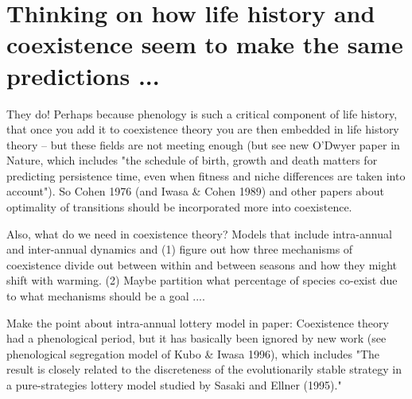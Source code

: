 \documentclass[11pt]{article}
\begin{document}
\section{Thinking on how life history and coexistence seem to make the same predictions ...}
They do! Perhaps because phenology is such a critical component of life history, that once you add it to coexistence theory you are then embedded in life history theory -- but these fields are not meeting enough (but see new O'Dwyer paper in Nature, which includes "the schedule of birth, growth and death matters for predicting persistence time, even when fitness and niche differences are taken into account"). So Cohen 1976 (and Iwasa \& Cohen 1989) and other papers about optimality of transitions should be incorporated more into coexistence. 

Also, what do we need in coexistence theory? Models that include intra-annual and inter-annual dynamics and (1) figure out how three mechanisms of coexistence divide out between within and between seasons and how they might shift with warming. (2) Maybe partition what percentage of species co-exist due to what mechanisms should be a goal .... 

Make the point about intra-annual lottery model in paper: Coexistence theory had a phenological period, but it has basically been ignored by new work (see phenological segregation model of Kubo \& Iwasa 1996), which includes "The result is closely related to the discreteness of the evolutionarily stable strategy in a pure-strategies lottery model studied by Sasaki and Ellner (1995)." 
\end{document}
